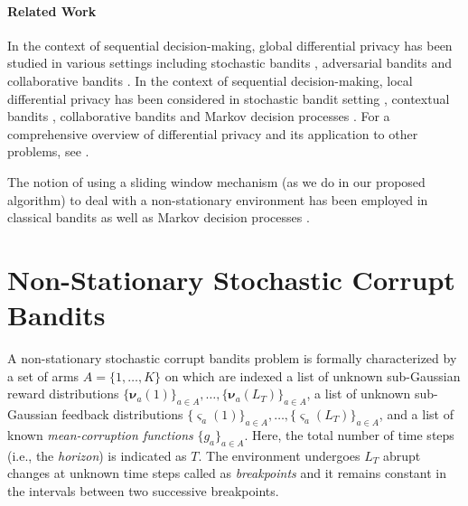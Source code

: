 \documentclass[letterpaper]{article} %
\newcommand{\numChanges}{L}
\newcommand{\RewardDist}[2]{\boldsymbol{\nu}_{#1}(#2)}
\newcommand{\FeedbackDist}[2]{\boldsymbol{\varsigma}_{#1}(#2)}
\begin{document}
\paragraph{Related Work}
In the context of sequential decision-making, global differential privacy has been studied in various settings including stochastic bandits \citep{DBLP:conf/uai/MishraT15, tossou:aaai2016}, adversarial bandits \citep{DBLP:conf/nips/ThakurtaS13, tossou:aaai2017a} and collaborative bandits \citep{10.1145/3383313.3412254}.  
In the context of sequential decision-making, local differential privacy has been considered in stochastic bandit setting \citep{pmlr-v83-gajane18a, pmlr-v151-tao22a}, contextual bandits \citep{NEURIPS2020_908c9a56}, collaborative bandits \citep{10.1145/3383313.3412254} and Markov decision processes \citep{Chowdhury_Zhou_2022, DBLP:journals/corr/abs-2010-07778}.
For a comprehensive overview of differential privacy and its application to other problems, see \citet{Dwork:2014:AFD:2693052.2693053}. 

The notion of using a sliding window mechanism (as we do in our proposed algorithm) to deal with a non-stationary environment has been employed in classical bandits \citep{GarivierSW} as well as Markov decision processes \citep{GajaneSW}.


\section{Non-Stationary Stochastic Corrupt Bandits}
A non-stationary stochastic corrupt bandits problem is formally characterized by a set of arms $A= \{1, \dots, K\}$ on which are indexed a list of unknown sub-Gaussian reward distributions $\{\RewardDist{a}{1} \}_{a\in A}, \dots, \{\RewardDist{a}{\numChanges_T} \}_{a\in A}$,
a list of unknown sub-Gaussian feedback distributions $\{\FeedbackDist{a}{1} \}_{a\in A}, \dots, \{\FeedbackDist{a}{\numChanges_T} \}_{a\in A}$, and a list of known \textit{mean-corruption functions} $\{g_a\}_{a\in A}$. Here, the total number of time steps (i.e., the \textit{horizon}) is indicated as $T$. The environment undergoes $\numChanges_T$ abrupt changes at unknown time steps called as \textit{breakpoints} and it remains constant in the intervals between two successive breakpoints.
\end{document}
